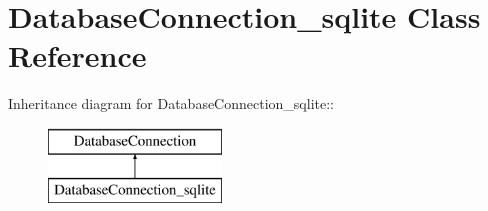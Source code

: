 \hypertarget{classDatabaseConnection__sqlite}{
\section{DatabaseConnection\_\-sqlite Class Reference}
\label{classDatabaseConnection__sqlite}
}
Inheritance diagram for DatabaseConnection\_\-sqlite::\begin{figure}[H]
\begin{center}
\leavevmode
\includegraphics[height=2cm]{classDatabaseConnection__sqlite}
\end{center}
\end{figure}
